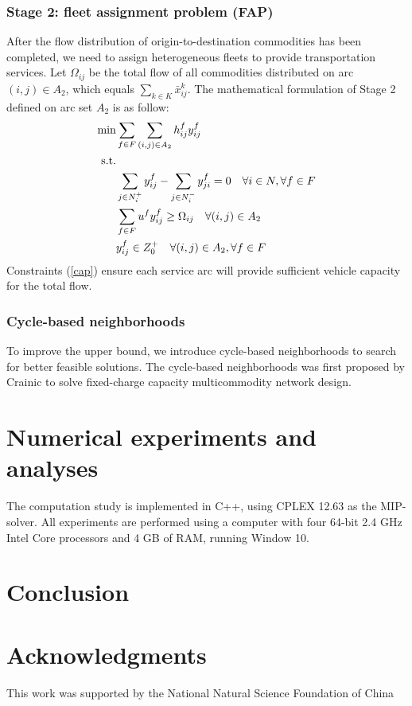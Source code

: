 \documentclass[11pt,nonblindrev,fleqn]{article}
\begin{document}
\subsubsection{Stage 2: fleet assignment problem (FAP)}
After the flow distribution of origin-to-destination commodities has been completed, we need to assign heterogeneous fleets to provide transportation services. Let $\Omega_{ij}$ be the total flow of all commodities distributed on arc $(i,j) \in A_2$, which equals $\sum_{k\in K}\bar{x}_{ij}^k$. The mathematical formulation of Stage 2 defined on arc set $A_2$ is as follow:
\begin{align}
  \min & \sum_{f\in F}\sum_{(i,j)\in A_2} h_{ij}^f y_{ij}^f \\
    \rm{s.t.} & \nonumber \\
     & \sum_{j\in N_i^+}y_{ij}^f - \sum_{j\in N_i^-}y_{ji}^f = 0     \quad      \forall i\in N,\forall f\in F  \\
     & \sum_{f\in F} u^f y_{ij}^f \geq \Omega_{ij}      \quad       \forall (i,j)\in A_2   \label{cap} \\
     & y_{ij}^f \in Z_0^+       \quad       \forall (i,j)\in A_2, \forall f\in F
\end{align}
Constraints (\ref{cap}) ensure each service arc will provide sufficient vehicle capacity for the total flow.

\subsubsection{Cycle-based neighborhoods}
To improve the upper bound, we introduce cycle-based neighborhoods to search for better feasible solutions. The cycle-based neighborhoods was first proposed by Crainic to solve fixed-charge capacity multicommodity network design.

\section{Numerical experiments and analyses}
The computation study is implemented in C++, using CPLEX 12.63 as the MIP-solver. All experiments are performed using a computer with four 64-bit 2.4 GHz Intel Core processors and 4 GB of RAM, running Window 10.

\section{Conclusion}

\section*{Acknowledgments}

This work was supported by the National Natural Science Foundation of China
\end{document}
